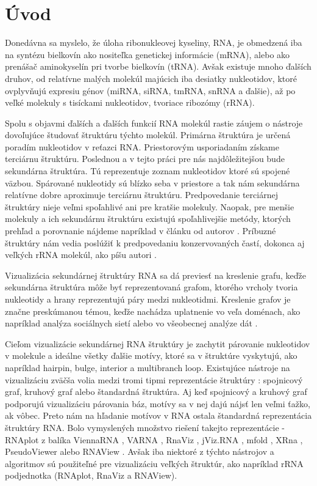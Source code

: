 
\chapter*{Úvod}

Donedávna sa myslelo, že úloha ribonukleovej kyseliny, RNA, je obmedzená
iba na syntézu bielkovín ako nositeľka genetickej informácie (mRNA),
alebo ako prenášač aminokyselín pri tvorbe bielkovín (tRNA).
Avšak existuje mnoho ďalších druhov, od relatívne malých molekúl majúcich
iba desiatky nukleotidov, ktoré ovplyvňujú expresiu génov (miRNA, siRNA, tmRNA, snRNA a ďalšie),
až po veľké molekuly s tisíckami nukleotidov, tvoriace ribozómy (rRNA).

Spolu s objavmi ďalších a ďalších funkcií RNA molekúl rastie záujem o nástroje dovoľujúce
študovať štruktúru týchto molekúl.
Primárna štruktúra je určená poradím nukleotidov v reťazci RNA. Priestorovým usporiadaním
získame terciárnu štruktúru. Poslednou a v tejto práci pre nás najdôležitejšou
bude sekundárna štruktúra. Tú reprezentuje zoznam nukleotidov ktoré sú spojené väzbou.
Spárované nukleotidy sú blízko seba v priestore a tak nám sekundárna relatívne
dobre aproximuje terciárnu štruktúru. Predpovedanie terciárnej štruktúry nieje veľmi
spoľahlivé ani pre kratšie molekuly. Naopak, pre menšie molekuly a ich  sekundárnu
štruktúru existujú spoľahlivejšie metódy, ktorých prehľad a porovnanie nájdeme napríklad
v článku od autorov \citet{SEC_STR_PREDICT_TOOLS}.
Príbuzné štruktúry nám vedia poslúžiť k predpovedaniu konzervovaných častí, dokonca
aj veľkých rRNA molekúl, ako píšu autori \citet{SEC_STR_PREDICTION}.

Vizualizácia sekundárnej štruktúry RNA sa dá previesť na kreslenie grafu, keďže
sekundárna štruktúra môže byť reprezentovaná grafom, ktorého vrcholy tvoria
nukleotidy a hrany reprezentujú páry medzi nukleotidmi.
Kreslenie grafov je značne preskúmanou témou, keďže nachádza uplatnenie vo veľa
doménach, ako napríklad analýza sociálnych sietí 
alebo vo všeobecnej analýze dát .

Cieľom vizualizácie sekundárnej RNA štruktúry je zachytit párovanie nukleotidov
v molekule a ideálne všetky ďalšie motívy, ktoré sa v štruktúre vyskytujú,
ako napríklad hairpin, bulge, interior a multibranch loop.
Existujúce nástroje na vizualizáciu zväčša volia medzi tromi tipmi reprezentácie
štruktúry : spojnicový graf, kruhový graf alebo štandardná štruktúra.
Aj keď spojnicový a kruhový graf podporujú vizualizáciu párovania báz, motívy
sa v nej dajú nájsť len veľmi ťažko, ak vôbec.
Preto nám na hľadanie motívov v RNA ostala štandardná reprezentácia štruktúry RNA.
Bolo vymyslených množstvo riešení takejto reprezentácie -
RNAplot z balíka ViennaRNA , VARNA ,
RnaViz , jViz.RNA , mfold ,
XRna , PseudoViewer  alebo
RNAView .
Avšak iba niektoré z týchto nástrojov a algoritmov sú použiteľné pre vizualizáciu
veľkých štruktúr, ako napríklad rRNA podjednotka (RNAplot, RnaViz a RNAView).

